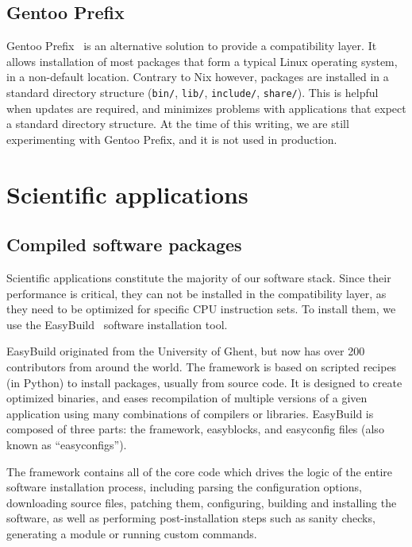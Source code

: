 \documentclass[sigconf]{acmart}
\begin{document}
\subsection{Gentoo Prefix}
\label{sub:Gentoo_Prefix}
Gentoo Prefix~\cite{Gentoo} is an alternative solution to provide a compatibility layer. It allows installation of most packages that form a typical Linux operating system, in a non-default location. Contrary to Nix however, packages are installed in a standard directory structure (\texttt{bin/}, \texttt{lib/}, \texttt{include/}, \texttt{share/}). This is helpful when updates are required, and minimizes problems with applications that expect a standard directory structure. At the time of this writing, we are still experimenting with Gentoo Prefix, and it is not used in production. 

\section{Scientific applications}
\label{sec:Scientific_applications}

\subsection{Compiled software packages}
\label{sub:Compiled_software_packages}
Scientific applications constitute the majority of our software stack. Since their performance is critical, they can not be installed in the compatibility layer, as they need to be optimized for specific CPU instruction sets. To install them, we use the EasyBuild~\cite{EasyBuild2012,EasyBuild2014,EasyBuild2016} software installation tool.

EasyBuild originated from the University of Ghent, but now has over 200 contributors from around the world. The framework is based on scripted recipes (in Python) to install packages, usually from source code. It is designed to create optimized binaries, and eases recompilation of multiple versions of a given application using many combinations of compilers or libraries. EasyBuild is composed of three parts: the framework, easyblocks, and easyconfig files (also known as ``easyconfigs''). 

The framework contains all of the core code which drives the logic of the entire software installation process, including parsing the configuration options, downloading source files, patching them, configuring, building and installing the software, as well as performing post-installation steps such as sanity checks, generating a module or running custom commands. 
\end{document}
